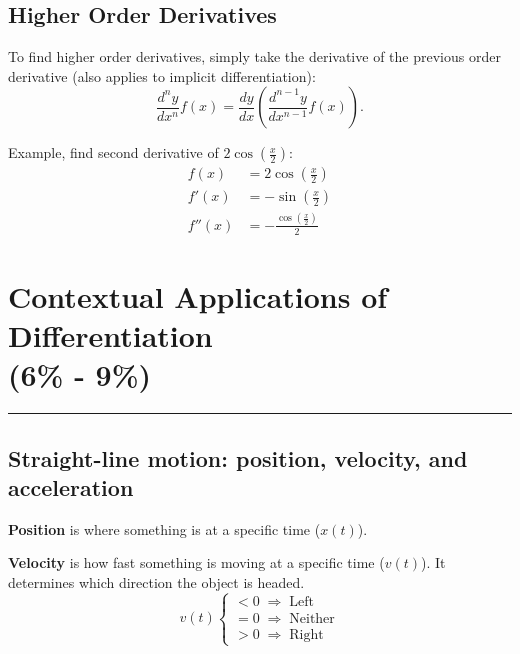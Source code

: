 \documentclass[12pt]{article}
\begin{document}
        \subsection{Higher Order Derivatives}
            To find higher order derivatives, simply take the derivative of the previous order derivative (also applies to implicit differentiation):
            \[ \frac{d^n y}{dx^n} f(x) = \frac{dy}{dx} \left( \frac{d^{n-1}y}{dx^{n-1}} f(x) \right). \]

            \noindent Example, find second derivative of $2\cos \left( \frac{x}{2} \right)$:
            \begin{align*}
                f(x) &= 2\cos \left( \frac{x}{2} \right) \\[6pt]
                f'(x) &= -\sin \left( \frac{x}{2} \right) \\[6pt]
                f''(x) &= -\frac{\cos \left( \frac{x}{2} \right)}{2}
            \end{align*}

    \section[Contextual Applications of Differentiation (6\% - 9\%)]{Contextual Applications of Differentiation \\(6\% - 9\%)}
    \par\noindent\rule{\textwidth}{0.1pt}

        \subsection{Straight-line motion: position, velocity, and acceleration}
            \noindent \textbf{Position} is where something is at a specific time ($x(t)$).

            \noindent \textbf{Velocity} is how fast something is moving at a specific time ($v(t)$). It determines which direction the object is headed.
            \[ v(t) \begin{cases}
                <0 \; \Rightarrow \; \text{Left} \\
                =0 \; \Rightarrow \; \text{Neither} \\
                >0 \; \Rightarrow \; \text{Right}
            \end{cases} \]
\end{document}
